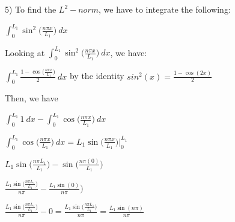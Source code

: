 \documentclass[executivepaper]{article}
\begin{document}
\begin{flushleft}

5) To find the $L^2-norm$, we have to integrate the following: 

\begin{center}

$\int_{0}^{L_{1}} \sin^2\bigg(\frac{n \pi x}{L_{1}}\bigg) \ dx$

\end{center}

Looking at $\int_{0}^{L_{1}} \sin^2\bigg(\frac{n \pi x}{L_{1}}\bigg) \ dx$, we have:

\begin{center}

$\int_{0}^{L_{1}} \frac{1-\cos\bigg(\frac{n \pi x}{L_{1}}\bigg)}{2} \ dx$ by the identity $sin^2(x)=\frac{1-\cos(2x)}{2}$

\end{center}

Then, we have

\begin{center}

$\int_{0}^{L_{1}} 1 \ dx - \int_{0}^{L_{1}} \cos\bigg(\frac{n \pi x}{L_{1}}\bigg) \ dx$

\vspace{2mm}

$\int_{0}^{L_{1}} \cos\bigg(\frac{n \pi x}{L_{1}}\bigg) \ dx=L_{1}\sin\bigg(\frac{n \pi x}{L_{1}}\bigg) \big |_0^{L_{1}}$

\vspace{2mm}

$L_{1}\sin\bigg(\frac{n \pi L_{1}}{L_{1}}\bigg) - \sin\bigg(\frac{n \pi (0)}{L_{1}}\bigg)$

\vspace{2mm}

$\frac{L_{1}\sin\bigg(\frac{n \pi L_{1}}{L_{1}}\bigg)}{n \pi} -\frac{L_{1}\sin(0)}{n \pi})$

\vspace{2mm}

$\frac{L_{1}\sin\bigg(\frac{n \pi L_{1}}{L_{1}}\bigg)}{n \pi}-0=\frac{L_{1}\sin\bigg(\frac{n \pi L_{1}}{L_{1}}\bigg)}{n \pi}=\frac{L_{1}\sin(n \pi)}{n \pi}$

\vspace{2mm}

\end{center}

\end{flushleft}
\end{document}
